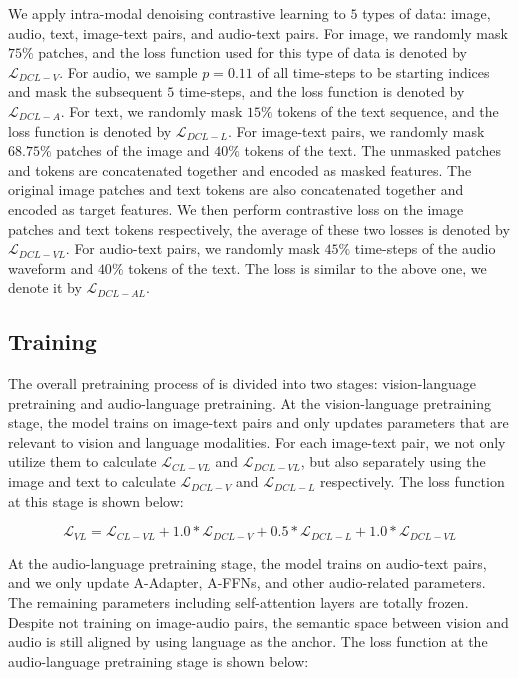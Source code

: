 We apply intra-modal denoising contrastive learning to $5$ types of data: image, audio, text, image-text pairs, and audio-text pairs.
For image, we randomly mask $75\%$ patches, and the loss function used for this type of data is denoted by $\mathcal{L}_{DCL-V}$.
For audio, we sample $p=0.11$ of all time-steps to be starting indices and mask the subsequent $5$ time-steps, and the loss function is denoted by $\mathcal{L}_{DCL-A}$.
For text, we randomly mask $15\%$ tokens of the text sequence, and the loss function is denoted by $\mathcal{L}_{DCL-L}$.
For image-text pairs, we randomly mask $68.75\%$ patches of the image and $40\%$ tokens of the text. The unmasked patches and tokens are concatenated together and encoded as masked features.
The original image patches and text tokens are also concatenated together and encoded as target features.
We then perform contrastive loss on the image patches and text tokens respectively, the average of these two
losses is denoted by $\mathcal{L}_{DCL-VL}$.
For audio-text pairs, we randomly mask $45\%$ time-steps of the audio waveform and $40\%$ tokens of the text. 
The loss is similar to the above one, we denote it by $\mathcal{L}_{DCL-AL}$.

\subsection{Training}
\label{sec:two_stage_pretraining}
The overall pretraining process of \onepeace is divided into two stages: vision-language pretraining and audio-language pretraining.
At the vision-language pretraining stage, the model trains on image-text pairs and only updates parameters that are relevant to vision and language modalities.
For each image-text pair, we not only utilize them to calculate $\mathcal{L}_{CL-VL}$ and $\mathcal{L}_{DCL-VL}$, but also separately using the image and text to calculate $\mathcal{L}_{DCL-V}$ and $\mathcal{L}_{DCL-L}$ respectively.
The loss function at this stage is shown below:

\begin{equation}
\mathcal{L}_{VL} = \mathcal{L}_{CL-VL} + 1.0*\mathcal{L}_{DCL-V} + 0.5*\mathcal{L}_{DCL-L} + 1.0*\mathcal{L}_{DCL-VL}
\end{equation}

At the audio-language pretraining stage, the model trains on audio-text pairs, and we only update A-Adapter, A-FFNs, and other audio-related parameters. 
The remaining parameters including self-attention layers are totally frozen.
Despite not training on image-audio pairs, the semantic space between vision and audio is still aligned by using language as the anchor.
The loss function at the audio-language pretraining stage is shown below:

